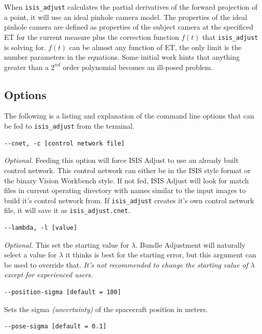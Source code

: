 When \texttt{isis\_adjust} calculates the partial derivatives of the
forward projection of a point, it will use an ideal pinhole camera
model. The properties of the ideal pinhole camera are defined as
properties of the subject camera at the specificed ET for the current
measure plus the correction function $f(t)$ that \texttt{isis\_adjust} is
solving for. $f(t)$ can be almost any function of ET, the only limit is the
number parameters in the equations. Some initial work hints that
anything greater than a $2^{nd}$ order polynomial becomes an ill-posed
problem.

\subsection{Options}

The following is a listing and explanation of the command line options
that can be fed to \texttt{isis\_adjust} from the terminal.

\begin{verbatim}
--cnet, -c [control network file]
\end{verbatim}

\emph{Optional.} Feeding this option will force ISIS Adjust to use an
already built control network. This control network can either be in
the ISIS style format or the binary Vision Workbench style. If not
fed, ISIS Adjust will look for match files in current operating
directory with names similar to the input images to build it's control
network from. If \texttt{isis\_adjust} creates it's own control
network file, it will save it as \verb=isis_adjust.cnet=.

\begin{verbatim}
--lambda, -l [value]
\end{verbatim}

\emph{Optional.} This set the starting value for $\lambda$. Bundle
Adjustment will naturally select a value for $\lambda$ it thinks is
best for the starting error, but this argument can be used to override
that. \emph{It's not recommended to change the starting value of
  $\lambda$ except for experienced users.}

\begin{verbatim}
--position-sigma [default = 100]
\end{verbatim}

Sets the sigma \emph{(uncertainty)} of the spacecraft position in
meters.

\begin{verbatim}
--pose-sigma [default = 0.1]
\end{verbatim}

